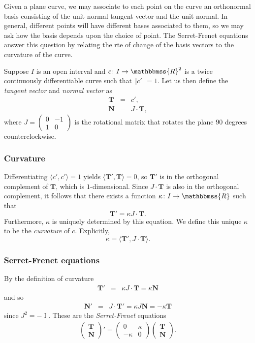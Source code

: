 \documentclass[12pt]{article}
\newcommand{\R}{\mathbbmss{R}}
\newcommand{\bT}[0]{\mathbf{T}}
\newcommand{\bN}[0]{\mathbf{N}}
\begin{document}
Given a plane curve, we may associate to each point on the curve an
orthonormal basis consisting of the unit normal tangent vector and
the unit normal.  In general, different points will have different 
bases associated to them, so we may ask how the basis depends upon
the choice of point.  The Serret-Frenet equations answer this
question by relating the rte of change of the basis vectors to
the curvature of the curve.

Suppose $I$ is an open interval and $c\colon I \to \R^2$ is a twice
continuously differentiable curve such that $\Vert c'\Vert = 1$. 
Let us then
define the \emph{tangent vecto{r}} and \emph{normal vecto{r}} as
\begin{eqnarray*}
   \bT &=& c', \\
   \bN &=& J \cdot \bT,
\end{eqnarray*}
where $J=\begin{pmatrix} 0 & -1 \\ 1 & 0 \end{pmatrix}$ is the 
rotational matrix that rotates the plane $90$ degrees counterclockwise.

\subsubsection*{Curvature}
Differentiating $\langle c',c'\rangle=1$ yields 
  $\langle \bT',\bT\rangle=0$, 
   so $\bT'$ is in the orthogonal complement of $\bT$,
  which is $1$-dimensional. Since $J\cdot \bT$ is also in 
    the orthogonal complement, 
  it follows that there exists a function $\kappa\colon I \to \R$ such that 
  $$
     \bT'=\kappa J \cdot \bT.
  $$
Furthermore, $\kappa$ is uniquely determined by this equation. 
We define this unique $\kappa$ to 
   be the \emph{curvatur{e}} of $c$. Explicitly,
$$
   \kappa = \langle \bT',J \cdot \bT \rangle.
$$

\subsubsection*{Serret-Frenet equations}
By the definition of curvature 
\begin{eqnarray*}
  \bT'&=& \kappa J\cdot \bT 
      = \kappa \bN
\end{eqnarray*}
and so
\begin{eqnarray*}
  \bN'&=& J\cdot \bT' 
      = \kappa J \bN 
      = -\kappa \bT 
\end{eqnarray*}
since $J^2=-\operatorname{I}$. These are the \emph{Serret-Frenet}
equations
\begin{eqnarray*}
   \begin{pmatrix} \bT \\ \bN\end{pmatrix}' = 
   \begin{pmatrix} 0 & \kappa \\ -\kappa & 0 \end{pmatrix}
\begin{pmatrix} \bT \\ \bN\end{pmatrix}.
\end{eqnarray*}
\end{document}
